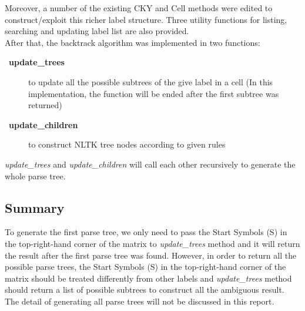 \documentclass{article}
\let\Item\item
\newcommand\SpecialItem{\renewcommand\item[1][]{\Item[\textbullet~\bfseries##1]}}
\begin{document}
Moreover, a number of the existing CKY and Cell methods were edited to construct/exploit this richer label structure. Three utility functions for listing, searching and updating label list are also provided.\\

After that, the backtrack algorithm was implemented in two functions:

\SpecialItem
\begin{description}
	\item[update\_trees] to update all the possible subtrees of the give label in a cell (In this implementation, the function will be ended after the first subtree was returned)
	\item[update\_children] to construct NLTK tree nodes according to given rules
\end{description}

\textit{update\_trees} and \textit{update\_children} will call each other recursively to generate the whole parse tree.

\subsection{Summary}
To generate the first parse tree, we only need to pass the Start Symbols (S) in the top-right-hand corner of the matrix to \textit{update\_trees} method and it will return the result after the first parse tree was found. However, in order to return all the possible parse trees, the Start Symbols (S) in the top-right-hand corner of the matrix should be treated differently from other labels and \textit{update\_trees} method should return a list of possible subtrees to construct all the ambiguous result. The detail of generating all parse trees will not be discussed in this report.







\end{document}
